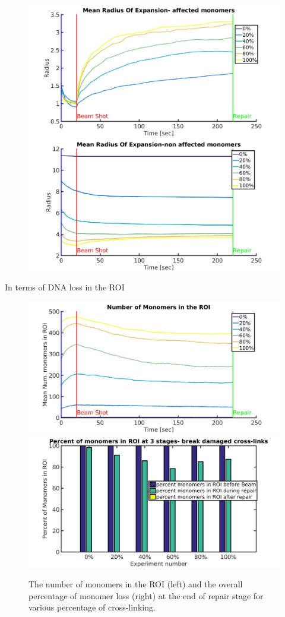 \documentclass[12pt]{report}
\begin{document}
	\begin{figure}[H]
	\includegraphics[width=0.5\linewidth, height=0.3\textheight]{Images/ExludeAroundDamagedMonomers/BreakDamagedCrosslinks/00/meanRadiusOfExpansionAffected}
		\includegraphics[width=0.5\linewidth, height=0.3\textheight]{Images/ExludeAroundDamagedMonomers/BreakDamagedCrosslinks/00/meanRadiusOfExpansionNonAffected}
	\caption{}
	\label{fig:meanRadiusOfExpansionAffectedVolumeOfExclusion}
	\end{figure}
	 In terms of DNA loss in the ROI
	 
	\begin{figure}[H]
	\includegraphics[width=0.5\linewidth, height=0.3\textheight]{Images/ExludeAroundDamagedMonomers/BreakDamagedCrosslinks/00/meanNumberOfMonomersInROI}
	\includegraphics[width=0.5\linewidth, height=0.3\textheight]{Images/ExludeAroundDamagedMonomers/BreakDamagedCrosslinks/00/percentOfMonomersInROI}
	\caption{The number of monomers in the ROI (left) and the overall percentage of monomer loss (right) at the end of repair stage for various percentage of cross-linking.}
	\label{fig:meanNumberOfMonomersInROIVolumeOfExclusion}
	\end{figure}
	 
\end{document}
